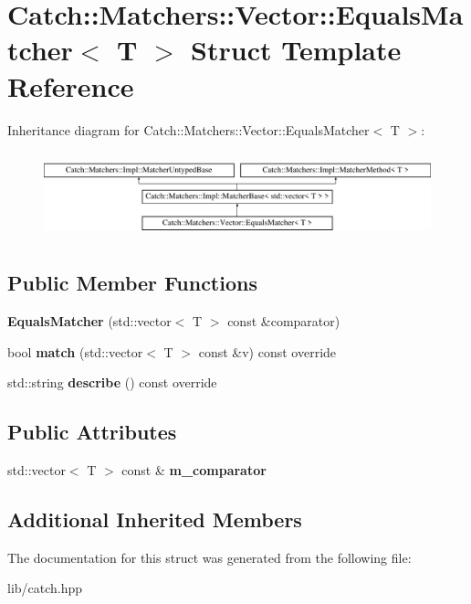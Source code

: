 \hypertarget{struct_catch_1_1_matchers_1_1_vector_1_1_equals_matcher}{}\section{Catch\+:\+:Matchers\+:\+:Vector\+:\+:Equals\+Matcher$<$ T $>$ Struct Template Reference}
\label{struct_catch_1_1_matchers_1_1_vector_1_1_equals_matcher}
Inheritance diagram for Catch\+:\+:Matchers\+:\+:Vector\+:\+:Equals\+Matcher$<$ T $>$\+:\begin{figure}[H]
\begin{center}
\leavevmode
\includegraphics[height=2.514970cm]{struct_catch_1_1_matchers_1_1_vector_1_1_equals_matcher}
\end{center}
\end{figure}
\subsection*{Public Member Functions}
\begin{DoxyCompactItemize}
\item 
\mbox{\label{struct_catch_1_1_matchers_1_1_vector_1_1_equals_matcher_a3846c47780d1991dcfe87aefded98008}} 
{\bfseries Equals\+Matcher} (std\+::vector$<$ T $>$ const \&comparator)
\item 
\mbox{\label{struct_catch_1_1_matchers_1_1_vector_1_1_equals_matcher_a2d96cca58a44151fddc5257eda3305da}} 
bool {\bfseries match} (std\+::vector$<$ T $>$ const \&v) const override
\item 
\mbox{\label{struct_catch_1_1_matchers_1_1_vector_1_1_equals_matcher_a36b5f7ecada4081d6c65bebe8ddea6f4}} 
std\+::string {\bfseries describe} () const override
\end{DoxyCompactItemize}
\subsection*{Public Attributes}
\begin{DoxyCompactItemize}
\item 
\mbox{\label{struct_catch_1_1_matchers_1_1_vector_1_1_equals_matcher_a56f7aa6f110a12b1b9aeb0cabbc9d755}} 
std\+::vector$<$ T $>$ const  \& {\bfseries m\+\_\+comparator}
\end{DoxyCompactItemize}
\subsection*{Additional Inherited Members}


The documentation for this struct was generated from the following file\+:\begin{DoxyCompactItemize}
\item 
lib/catch.\+hpp\end{DoxyCompactItemize}
